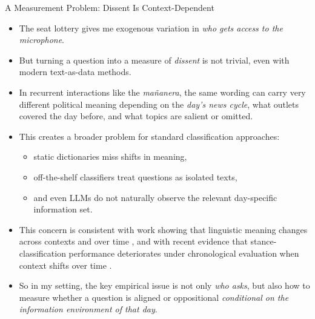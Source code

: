 \documentclass[10pt,aspectratio=169]{beamer}
\begin{document}

\begin{frame}{A Measurement Problem: Dissent Is Context-Dependent}
\small
\begin{itemize}
    \item The seat lottery gives me exogenous variation in \textit{who gets access to the microphone}. 
    \item But turning a question into a measure of \textit{dissent} is not trivial, even with modern text-as-data methods.
    
    \item In recurrent interactions like the \textit{ma\~nanera}, the same wording can carry very different political meaning depending on the \textit{day's news cycle}, what outlets covered the day before, and what topics are salient or omitted.

    \item This creates a broader problem for standard classification approaches:
    \begin{itemize}
        \item static dictionaries miss shifts in meaning,
        \item off-the-shelf classifiers treat questions as isolated texts,
        \item and even LLMs do not naturally observe the relevant day-specific information set.
    \end{itemize}

    \item This concern is consistent with work showing that linguistic meaning changes across contexts and over time \parencite{hamilton2016diachronic,hofmann2021dynamic}, and with recent evidence that stance-classification performance deteriorates under chronological evaluation when context shifts over time \parencite{mu2024examining}.
    
    \item So in my setting, the key empirical issue is not only \textit{who asks}, but also how to measure whether a question is aligned or oppositional \textit{conditional on the information environment of that day}.
\end{itemize}
\end{frame}
\end{document}
